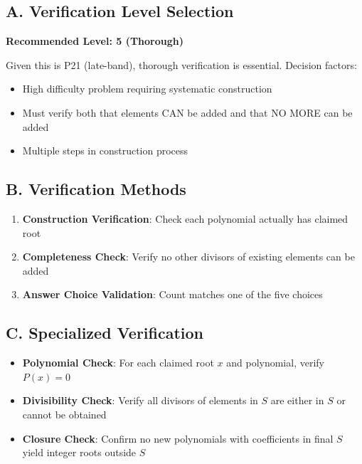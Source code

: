 \documentclass[12pt]{article}
\begin{document}
\begin{verificationbox}
\subsection*{A. Verification Level Selection}
\textbf{Recommended Level: 5 (Thorough)}

Given this is P21 (late-band), thorough verification is essential. Decision factors:
\begin{itemize}
    \item High difficulty problem requiring systematic construction
    \item Must verify both that elements CAN be added and that NO MORE can be added
    \item Multiple steps in construction process
\end{itemize}

\subsection*{B. Verification Methods}
\begin{enumerate}
    \item \textbf{Construction Verification}: Check each polynomial actually has claimed root
    \item \textbf{Completeness Check}: Verify no other divisors of existing elements can be added
    \item \textbf{Answer Choice Validation}: Count matches one of the five choices
\end{enumerate}

\subsection*{C. Specialized Verification}
\begin{itemize}
    \item \textbf{Polynomial Check}: For each claimed root $x$ and polynomial, verify $P(x) = 0$
    \item \textbf{Divisibility Check}: Verify all divisors of elements in $S$ are either in $S$ or cannot be obtained
    \item \textbf{Closure Check}: Confirm no new polynomials with coefficients in final $S$ yield integer roots outside $S$
\end{itemize}
\end{verificationbox}
\end{document}
